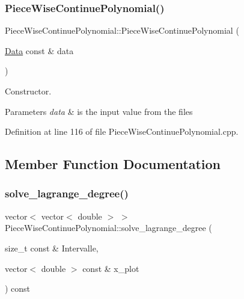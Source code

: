 \subsubsection{\texorpdfstring{Piece\+Wise\+Continue\+Polynomial()}{PieceWiseContinuePolynomial()}}
{\footnotesize\ttfamily Piece\+Wise\+Continue\+Polynomial\+::\+Piece\+Wise\+Continue\+Polynomial (\begin{DoxyParamCaption}\item[{\mbox{\hyperlink{struct_data}{Data}} const \&}]{data }\end{DoxyParamCaption})\hspace{0.3cm}{\ttfamily [explicit]}}



Constructor. 


\begin{DoxyParams}{Parameters}
{\em data} & is the input value from the files \\
\hline
\end{DoxyParams}


Definition at line 116 of file Piece\+Wise\+Continue\+Polynomial.\+cpp.



\subsection{Member Function Documentation}
\mbox{\label{class_piece_wise_continue_polynomial_a8d69630f929742ccc6f1a411cf5d9c15}} 
\subsubsection{\texorpdfstring{solve\+\_\+lagrange\+\_\+degree()}{solve\_lagrange\_degree()}}
{\footnotesize\ttfamily vector$<$ vector$<$ double $>$ $>$ Piece\+Wise\+Continue\+Polynomial\+::solve\+\_\+lagrange\+\_\+degree (\begin{DoxyParamCaption}\item[{size\+\_\+t const \&}]{Intervalle,  }\item[{vector$<$ double $>$ const \&}]{x\+\_\+plot }\end{DoxyParamCaption}) const}



